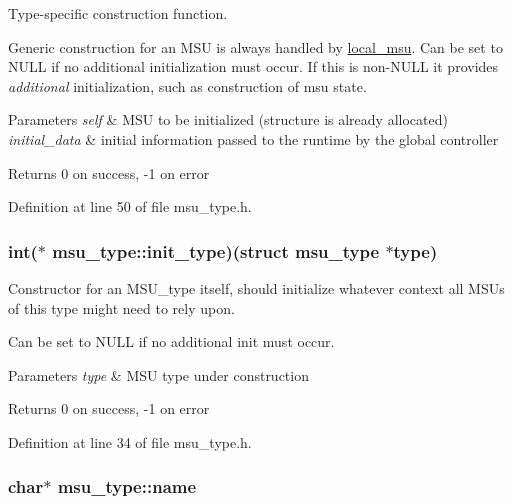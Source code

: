 Type-\/specific construction function. 

Generic construction for an M\-S\-U is always handled by \hyperlink{structlocal__msu}{local\-\_\-msu}. Can be set to N\-U\-L\-L if no additional initialization must occur. If this is non-\/\-N\-U\-L\-L it provides {\itshape additional} initialization, such as construction of msu state. 
\begin{DoxyParams}{Parameters}
{\em self} & M\-S\-U to be initialized (structure is already allocated) \\
\hline
{\em initial\-\_\-data} & initial information passed to the runtime by the global controller \\
\hline
\end{DoxyParams}
\begin{DoxyReturn}{Returns}
0 on success, -\/1 on error 
\end{DoxyReturn}


Definition at line 50 of file msu\-\_\-type.\-h.

\hypertarget{structmsu__type_a5dd9b478727fefecff8cf16525003135}{
\subsubsection[{init\-\_\-type}]{\setlength{\rightskip}{0pt plus 5cm}int($\ast$ msu\-\_\-type\-::init\-\_\-type)(struct {\bf msu\-\_\-type} $\ast$type)}}\label{structmsu__type_a5dd9b478727fefecff8cf16525003135}


Constructor for an M\-S\-U\-\_\-type itself, should initialize whatever context all M\-S\-Us of this type might need to rely upon. 

Can be set to N\-U\-L\-L if no additional init must occur. 
\begin{DoxyParams}{Parameters}
{\em type} & M\-S\-U type under construction \\
\hline
\end{DoxyParams}
\begin{DoxyReturn}{Returns}
0 on success, -\/1 on error 
\end{DoxyReturn}


Definition at line 34 of file msu\-\_\-type.\-h.

\hypertarget{structmsu__type_ade4e1d9d98f0e22f3a54986919b07665}{
\subsubsection[{name}]{\setlength{\rightskip}{0pt plus 5cm}char$\ast$ msu\-\_\-type\-::name}}\label{structmsu__type_ade4e1d9d98f0e22f3a54986919b07665}


